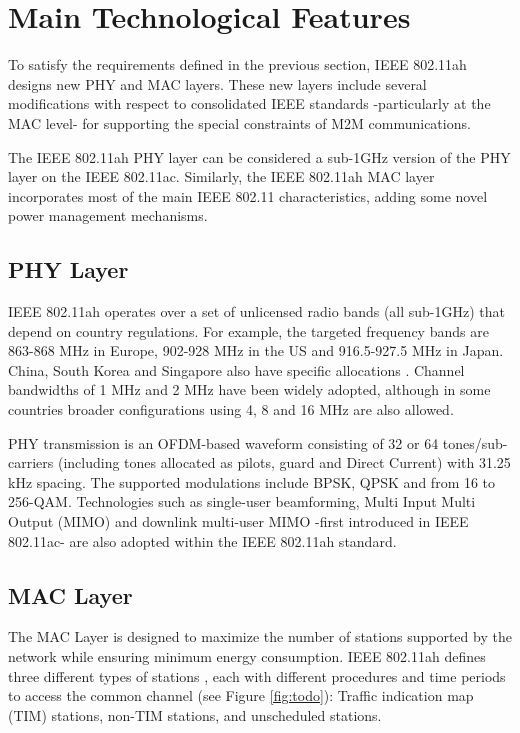 \documentclass[]{article}
\begin{document}
\section{Main Technological Features} \label{technology}

To satisfy the requirements defined in the previous section, IEEE 802.11ah designs new PHY and MAC layers. These new layers include several modifications with respect to consolidated IEEE standards -particularly at the MAC level- for supporting the special constraints of M2M communications. 

The IEEE 802.11ah PHY layer can be considered a sub-1GHz version of the PHY layer on the IEEE 802.11ac. Similarly, the IEEE 802.11ah MAC layer incorporates most of the main IEEE 802.11 characteristics, adding some novel power management mechanisms.

\subsection{PHY Layer}

IEEE 802.11ah operates over a set of unlicensed radio bands (all sub-1GHz) that depend on country regulations. For example, the targeted frequency bands are 863-868 MHz in Europe, 902-928 MHz in the US and 916.5-927.5 MHz in Japan. China, South Korea and Singapore also have specific allocations \cite{aust2012ieee}. Channel bandwidths of 1 MHz and 2 MHz have been widely adopted, although in some countries broader configurations using 4, 8 and 16 MHz are also allowed. 

PHY transmission is an OFDM-based waveform consisting of 32 or 64 tones/sub-carriers (including tones allocated as pilots, guard and Direct Current) with 31.25 kHz spacing. The supported modulations include BPSK, QPSK and from 16 to 256-QAM. Technologies such as single-user beamforming, Multi Input Multi Output (MIMO) and downlink multi-user MIMO -first introduced in IEEE 802.11ac- are also adopted within the IEEE 802.11ah standard.

\subsection{MAC Layer}
\label{MAC}

The MAC Layer is designed to maximize the number of stations supported by the network while ensuring minimum energy consumption. IEEE 802.11ah defines three different types of stations \cite{Draft802.11ah}, each with different procedures and time periods to access the common channel (see Figure \ref{fig:todo}): Traffic indication map (TIM) stations, non-TIM stations, and unscheduled stations.
\end{document}

